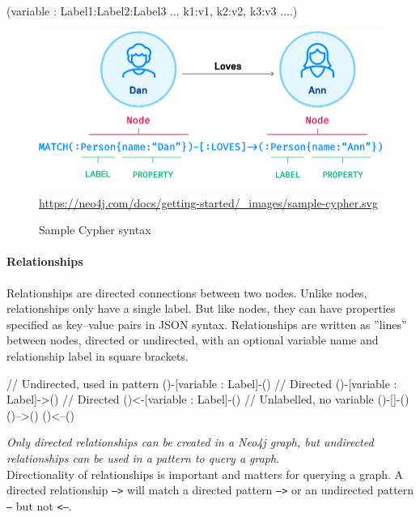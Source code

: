 \begin{cyphercode}
(variable : Label1:Label2:Label3 ... {k1:v1, k2:v2, k3:v3 ....})
\end{cyphercode}


\begin{figure}
\centering
\includegraphics[width=.75\textwidth]{sample-cypher.png}
\scriptsize{\url{https://neo4j.com/docs/getting-started/_images/sample-cypher.svg}}
\caption{Sample Cypher syntax}
\label{fig:sample-cypher}
\end{figure}

\paragraph*{Relationships} Relationships are directed connections between two nodes. Unlike nodes, relationships only have a single label. But like nodes, they can have properties specified as key--value pairs in JSON syntax. Relationships are written as ''lines'' between nodes, directed or undirected, with an optional variable name and relationship label in square brackets. 

\begin{samepage}
\begin{cyphercode}
// Undirected, used in pattern
()-[variable : Label]-()  
// Directed 
()-[variable : Label]->() 
// Directed
()<-[variable : Label]-() 
// Unlabelled, no variable
()-[]-()    
()-->()
()<--()
\end{cyphercode}
\end{samepage}

\begin{tcolorbox}[colback=alert]
\emph{Only directed relationships can be created in a Neo4j graph, but undirected relationships can be used in a pattern to query a graph}. \\

Directionality of relationships is important and matters for querying a graph. A directed relationship \texttt{-->} will match a directed pattern \texttt{-->} or an undirected pattern \texttt{--} but not \texttt{<--}. 
\end{tcolorbox}

